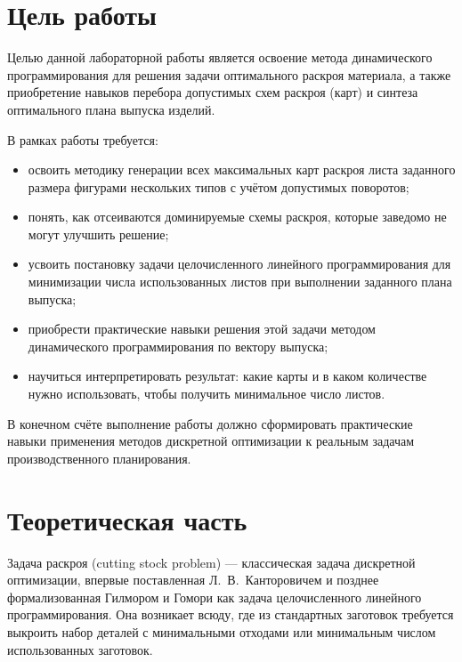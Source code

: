 

\section{Цель работы}

Целью данной лабораторной работы является освоение метода динамического
программирования для решения задачи оптимального раскроя материала, а также
приобретение навыков перебора допустимых схем раскроя (карт) и синтеза
оптимального плана выпуска изделий.

В рамках работы требуется:
\begin{itemize}
    \item освоить методику генерации всех максимальных карт раскроя листа
          заданного размера фигурами нескольких типов с учётом допустимых
          поворотов;
    \item понять, как отсеиваются доминируемые схемы раскроя, которые
          заведомо не могут улучшить решение;
    \item усвоить постановку задачи целочисленного линейного программирования
          для минимизации числа использованных листов при выполнении
          заданного плана выпуска;
    \item приобрести практические навыки решения этой задачи методом
          динамического программирования по вектору выпуска;
    \item научиться интерпретировать результат: какие карты и в каком
          количестве нужно использовать, чтобы получить минимальное число
          листов.
\end{itemize}

В конечном счёте выполнение работы должно сформировать практические навыки
применения методов дискретной оптимизации к реальным задачам
производственного планирования.

\clearpage

\clearpage




\clearpage

\section{Теоретическая часть}

Задача раскроя (cutting stock problem) — классическая задача дискретной
оптимизации, впервые поставленная Л.~В.~Канторовичем и позднее
формализованная Гилмором и Гомори как задача целочисленного линейного
программирования. Она возникает всюду, где из стандартных заготовок
требуется выкроить набор деталей с минимальными отходами или
минимальным числом использованных заготовок.

